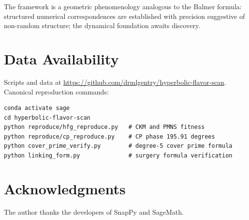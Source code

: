 \documentclass[11pt,a4paper]{article}
\theoremstyle{definition}
\theoremstyle{remark}
\begin{document}
The framework is a geometric phenomenology analogous to the
Balmer formula: structured numerical correspondences are
established with precision suggestive of non-random structure;
the dynamical foundation awaits discovery.

\section*{Data Availability}
Scripts and data at
\url{https://github.com/drmlgentry/hyperbolic-flavor-scan}.
Canonical reproduction commands:
\begin{verbatim}
conda activate sage
cd hyperbolic-flavor-scan
python reproduce/hfg_reproduce.py   # CKM and PMNS fitness
python reproduce/cp_reproduce.py    # CP phase 195.91 degrees
python cover_prime_verify.py        # degree-5 cover prime formula
python linking_form.py              # surgery formula verification
\end{verbatim}

\section*{Acknowledgments}
The author thanks the developers of SnapPy and SageMath.
\end{document}
